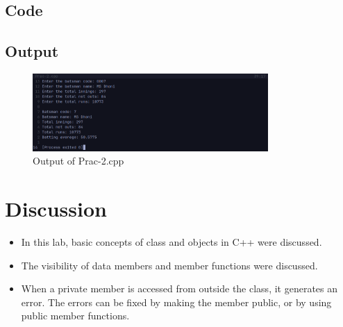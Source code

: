 \documentclass[12pt]{article}
\begin{document}
\subsection*{Code}


\subsection*{Output}
\begin{figure}[htpb]
    \centering
    \includegraphics[width=0.8\textwidth]{Prac-2.png}
    \caption{Output of Prac-2.cpp}
\end{figure}


\newpage
\section*{Discussion}
\begin{itemize}
    \item In this lab, basic concepts of class and objects in C++ were discussed.
    \item The visibility of data members and member functions were discussed.
    \item When a private member is accessed from outside the class, it generates an error. The errors can be fixed by making the member public, or by using public member functions.
\end{itemize}
\end{document}

